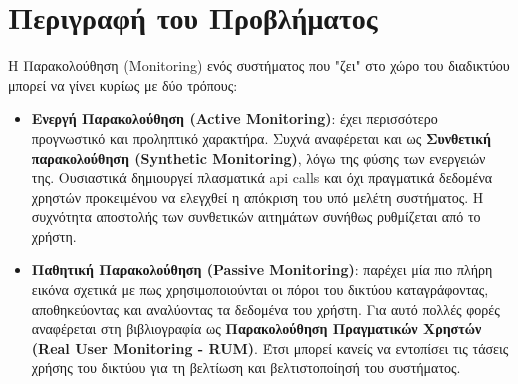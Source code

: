 \section{Περιγραφή του Προβλήματος}
\label{section:problem_description}

Η Παρακολούθηση (Monitoring) ενός συστήματος που "ζει" στο χώρο του διαδικτύου μπορεί να γίνει κυρίως με δύο τρόπους:

\begin{itemize}
	\item \textbf{Ενεργή Παρακολούθηση (Active Monitoring)}: έχει περισσότερο προγνωστικό και προληπτικό χαρακτήρα.
		Συχνά αναφέρεται και ως \textbf{Συνθετική παρακολούθηση (Synthetic Monitoring)}, λόγω της φύσης των ενεργειών της.
		Ουσιαστικά δημιουργεί πλασματικά api calls και όχι πραγματικά δεδομένα χρηστών 
		προκειμένου να ελεγχθεί η απόκριση του υπό μελέτη συστήματος. Η συχνότητα αποστολής των
		συνθετικών αιτημάτων συνήθως ρυθμίζεται από το χρήστη.
	\item \textbf{Παθητική Παρακολούθηση (Passive Monitoring)}: παρέχει μία πιο πλήρη εικόνα σχετικά με πως χρησιμοποιούνται οι πόροι του δικτύου
		καταγράφοντας, αποθηκεύοντας και αναλύοντας τα δεδομένα του χρήστη. Για αυτό πολλές φορές αναφέρεται στη βιβλιογραφία ως \textbf{Παρακολούθηση Πραγματικών Χρηστών (Real User Monitoring - RUM)}. Έτσι μπορεί κανείς
		να εντοπίσει τις τάσεις χρήσης του δικτύου για τη βελτίωση και βελτιστοποίησή του συστήματος.
\end{itemize}


